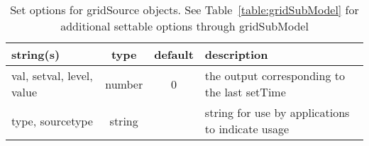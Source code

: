 \begin{table}[ht]
\centering
\begin{tabular}{p{5cm} c c p{7cm}}
\hline
string(s) & type & default & description \\
\hline
val, setval, level, value & number & 0 & the output corresponding to the last setTime\\
type, sourcetype & string &  & string for use by applications to indicate usage\\
\hline
\end{tabular}
\caption{Set options for gridSource objects. See Table~\ref{table:gridSubModel} for additional settable options through gridSubModel}
\label{table:gridSource}
\end{table}

